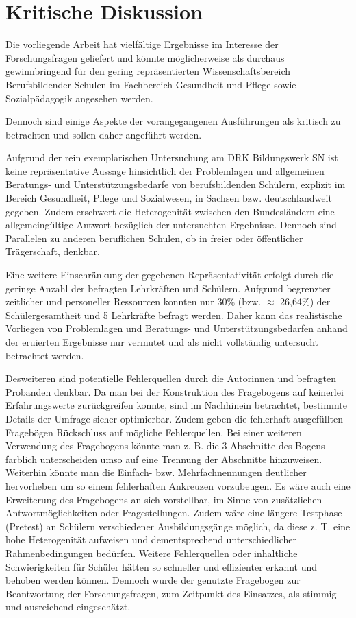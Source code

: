 \section{Kritische Diskussion}
\label{sec:KritischeDiskussion}

Die vorliegende Arbeit hat vielfältige Ergebnisse im Interesse der Forschungsfragen geliefert und könnte möglicherweise als durchaus gewinnbringend für den gering repräsentierten Wissenschaftsbereich Berufsbildender Schulen im Fachbereich Gesundheit und Pflege sowie Sozialpädagogik angesehen werden.

Dennoch sind einige Aspekte der vorangegangenen Ausführungen als kritisch zu betrachten und sollen daher angeführt werden.

Aufgrund der rein exemplarischen Untersuchung am DRK Bildungswerk SN ist keine repräsentative Aussage hinsichtlich der Problemlagen und allgemeinen Beratungs- und Unterstützungsbedarfe von berufsbildenden Schülern, explizit im Bereich Gesundheit, Pflege und Sozialwesen, in Sachsen bzw. deutschlandweit gegeben. Zudem erschwert die Heterogenität zwischen den Bundesländern eine allgemeingültige Antwort bezüglich der untersuchten Ergebnisse. Dennoch sind Parallelen zu anderen beruflichen Schulen, ob in freier oder öffentlicher Trägerschaft, denkbar.

Eine weitere Einschränkung der gegebenen Repräsentativität erfolgt durch die geringe Anzahl der befragten Lehrkräften und Schülern. Aufgrund begrenzter zeitlicher und personeller Ressourcen konnten nur 30\% (bzw. $\approx$ 26,64\%) der Schülergesamtheit und 5 Lehrkräfte befragt werden. Daher kann das realistische Vorliegen von Problemlagen und Beratungs- und Unterstützungsbedarfen anhand der eruierten Ergebnisse nur vermutet und als nicht vollständig untersucht betrachtet werden. 

Desweiteren sind potentielle Fehlerquellen durch die Autorinnen und befragten Probanden denkbar. Da man bei der Konstruktion des Fragebogens auf keinerlei Erfahrungswerte zurückgreifen konnte, sind im Nachhinein betrachtet, bestimmte Details der Umfrage sicher optimierbar. Zudem geben die fehlerhaft ausgefüllten Fragebögen Rückschluss auf mögliche Fehlerquellen. Bei einer weiteren Verwendung des Fragebogens könnte man z. B. die 3 Abschnitte des Bogens farblich unterscheiden umso auf eine Trennung der Abschnitte hinzuweisen. Weiterhin könnte man die Einfach- bzw. Mehrfachnennungen deutlicher hervorheben um so einem fehlerhaften Ankreuzen vorzubeugen. Es wäre auch eine Erweiterung des Fragebogens an sich vorstellbar, im Sinne von zusätzlichen Antwortmöglichkeiten oder Fragestellungen. Zudem wäre eine längere Testphase (Pretest) an Schülern verschiedener Ausbildungsgänge möglich, da diese z. T. eine hohe Heterogenität aufweisen und dementsprechend unterschiedlicher Rahmenbedingungen bedürfen. Weitere Fehlerquellen oder inhaltliche Schwierigkeiten für Schüler hätten so schneller und effizienter erkannt und behoben werden können. Dennoch wurde der genutzte Fragebogen zur Beantwortung der Forschungsfragen, zum Zeitpunkt des Einsatzes, als stimmig und ausreichend eingeschätzt.

